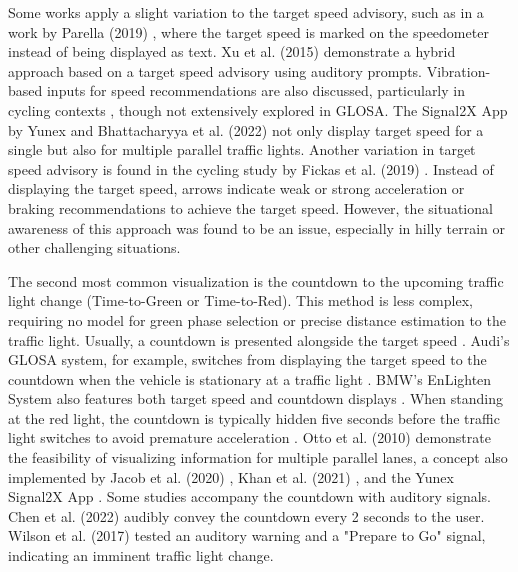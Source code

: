 Some works apply a slight variation to the target speed advisory, such as in a work by Parella (2019) \cite{marias_parella_design_2019}, where the target speed is marked on the speedometer instead of being displayed as text. Xu et al. (2015) \cite{xu_bb_2015} demonstrate a hybrid approach based on a target speed advisory using auditory prompts. Vibration-based inputs for speed recommendations are also discussed, particularly in cycling contexts \cite{cespedes_group_2019}, though not extensively explored in GLOSA. The Signal2X App by Yunex \cite{yunex_traffic_v2x-kommunikation_2023} and Bhattacharyya et al. (2022) \cite{bhattacharyya_assessing_2022} not only display target speed for a single but also for multiple parallel traffic lights. Another variation in target speed advisory is found in the cycling study by Fickas et al. (2019) \cite{fickas_fast_2019}. Instead of displaying the target speed, arrows indicate weak or strong acceleration or braking recommendations to achieve the target speed. However, the situational awareness of this approach was found to be an issue, especially in hilly terrain or other challenging situations.

The second most common visualization is the countdown to the upcoming traffic light change (Time-to-Green or Time-to-Red). This method is less complex, requiring no model for green phase selection or precise distance estimation to the traffic light. Usually, a countdown is presented alongside the target speed \cite{koukoumidis_signalguru_2011, koukoumidis_leveraging_2012}. Audi's GLOSA system, for example, switches from displaying the target speed to the countdown when the vehicle is stationary at a traffic light \cite{zweck_traffic_2013}. BMW's EnLighten System also features both target speed and countdown displays \cite{sokolov_effects_2018}. When standing at the red light, the countdown is typically hidden five seconds before the traffic light switches to avoid premature acceleration \cite{stahlmann_exploring_2018, sokolov_effects_2018}. Otto et al. (2010) \cite{otto_operating_2010} demonstrate the feasibility of visualizing information for multiple parallel lanes, a concept also implemented by Jacob et al. (2020) \cite{jacob_ivs-kom_2020}, Khan et al. (2021) \cite{khan_eco-drive_2021}, and the Yunex Signal2X App \cite{yunex_traffic_v2x-kommunikation_2023}. Some studies accompany the countdown with auditory signals. Chen et al. (2022) \cite{chen_developing_2022} audibly convey the countdown every 2 seconds to the user. Wilson et al. (2017) \cite{wilson_driver_2017} tested an auditory warning and a "Prepare to Go" signal, indicating an imminent traffic light change.

